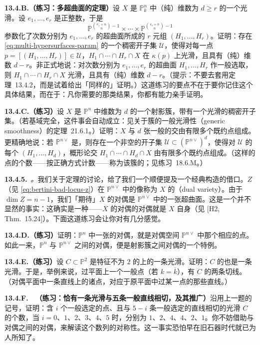\textbf{13.4.B.（练习：多超曲面的\trBertini{}定理）}\quad 设 $X$ 是 $\mathbb{P}^n_k$ 中（纯）维数为 $d\ge r$ 的一个光滑\trSubvariety。设 $e_1,\dots,e_r$ 是正整数，于是
\begin{equation*}\tag{13.4.4.1}\label{eq:multi-hypersurfaces-param}
\mathbb{P}^{\binom{e_1+n}{n}-1}\times\cdots\times\mathbb{P}^{\binom{e_r+n}{n}-1}
\end{equation*}
参数化了次数分别为 $e_1,\dots,e_r$ 的超曲面所成的 $r$ 元组 $(H_1,\dots,H_r)$。证明：存在 \eqref{eq:multi-hypersurfaces-param} 的一个稠密开子集 $\mathcal{U}$，使得对每一点 $p=[(H_1,\dots,H_r)]\in\mathcal{U}$，$H_1\cap\cdots\cap H_r\cap X$ 在 $\kappa(p)$ 上光滑，且具有（纯）维数 $d-r$。非正式地说：对次数分别为 $e_1,\dots,e_r$ 的超曲面 $H_1,\dots,H_r$ 作一般选取，则 $H_1\cap\cdots\cap H_r\cap X$ 光滑，且具有（纯）维数 $d-r$。（提示：不要去套用\trBertini{}定理~13.4.2，而是试着给出「同样的」证明。）这道练习的要点不在于要你记住这个具体结果，而在于：凡你需要的那类结果，你都有能力亲手证明。

\textbf{13.4.C.（练习）}\quad 设 $X$ 是 $\mathbb{P}^n$ 中维数为 $d$ 的一个射影簇，带有一个光滑的稠密开子集。（若基域完全，这件事会自动成立：见关于簇的一般光滑性（generic smoothness）的定理~21.6.1。）证明：$X$ 与 $d$ 张一般\trHyperplane{}的交由有限多个既约点组成。更精确地说：若 $\mathbb{P}^{n\vee}$ 是\trDualProjectiveSpace，则存在一个非空的\trZariski{}开子集 $\mathcal{U}\subset(\mathbb{P}^{n\vee})^d$，使得对 $\mathcal{U}$ 的每个\trClosedPoint{} $(H_1,\dots,H_d)$，概形论交 $H_1\cap\cdots\cap H_d\cap X$ 由有限多个既约点组成。（这样的点的个数——按正确方式计数——称为该簇的\trDegree；见\mbox{练习~18.6.M}。）

\textbf{13.4.5.}\ \emph{\trDualVariety。}\quad 我们关于\trBertini{}定理的讨论，给了我们一个顺便提及一个经典构造的借口。$Z$（见 \eqref{eq:bertini-bad-locus-z}）在 $\mathbb{P}^{n\vee}$ 中的像称为 $X$ 的\textbf{\trDualVariety}（dual variety）。由于 $\dim Z=n-1$，我们「期待」$X$ 的对偶是 $\mathbb{P}^{n\vee}$ 中的一张超曲面。这是一个并不显然的事实：这确实是一种\trDuality——$X$ 的对偶的对偶就是 $X$ 自身（见 [H2, Thm.~15.24]）。下面这道练习会让你对\trDualVariety{}有几分感觉。

\textbf{13.4.D.（练习）}\quad 证明：$\mathbb{P}^n$ 中一张\trHyperplane{}的对偶，就是对偶空间 $\mathbb{P}^{n\vee}$ 中那个相应的点。如此一来，$\mathbb{P}^n$ 与 $\mathbb{P}^{n\vee}$ 之间的对偶，便是射影簇之间对偶的一个特例。

\textbf{13.4.E.（练习）}\quad 设 $C\subset\mathbb{P}^2$ 是特征不为 $2$ 的\trAlgClosedField{}上的一条光滑\trConic。证明：$C$ 的\trDualVariety{}也是一条光滑\trConic。于是，举例来说，过平面上一个一般点（若 $k=\overline{k}$），有 $C$ 的两条切线。（对偶平面中一条直线上的诸点，对应于原平面中过某一点的那些直线。）

\textbf{13.4.F.}\ \hard\ \textbf{（练习：恰有一条光滑\trConic{}与五条一般直线相切，及其推广）}\quad 沿用上一题的记号，证明：含 $i$ 个一般选定的点、且与 $5-i$ 条一般选定的直线相切的光滑\trConic{} $C$ 的个数，当 $i=0$、$1$、$2$、$3$、$4$、$5$ 时，分别为 $1$、$2$、$4$、$4$、$2$、$1$。你不妨借助\trConic{}与对偶\trConic{}之间的对偶，来解读这个数列的对称性。这一事实恐怕早在旧石器时代就已为人所知了。
